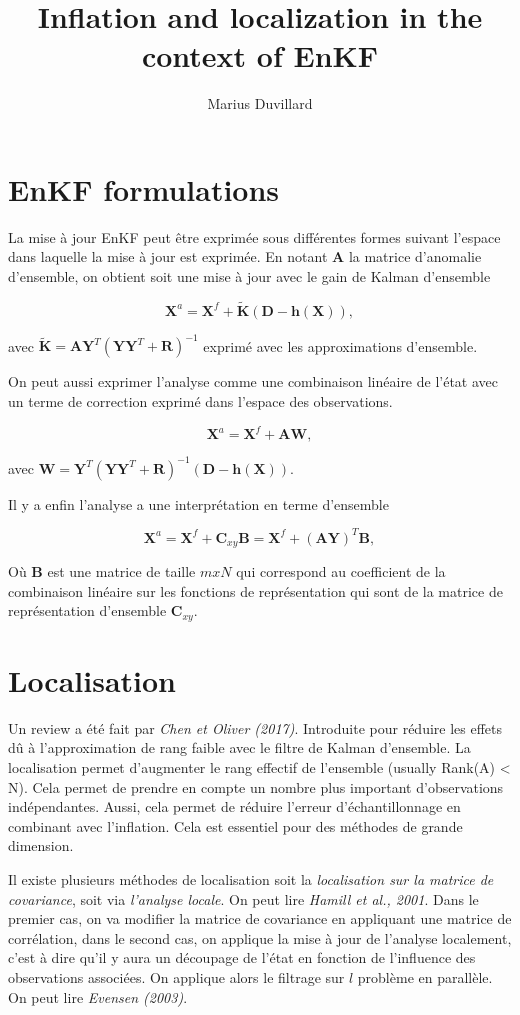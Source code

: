 \documentclass{article}
\title{Inflation and localization in the context of EnKF}
\author{Marius Duvillard}
\newcommand{\bA}{\bm{A}}
\newcommand{\bX}{\bm{X}}
\newcommand{\bK}{\tilde{\bm{K}}}
\newcommand{\bD}{\bm{D}}
\newcommand{\bY}{\bm{Y}}
\newcommand{\bW}{\bm{W}}
\newcommand{\bB}{\bm{B}}
\newcommand{\bR}{\bm{R}}
\newcommand{\bh}{\bm{h}}
\newcommand{\bC}{\bm{C}}
\begin{document}
\maketitle

\section{EnKF formulations}

La mise à jour EnKF peut être exprimée sous différentes formes suivant l'espace dans laquelle la mise à jour est exprimée. En notant $\bA$ la matrice d'anomalie d'ensemble, on obtient soit une mise à jour avec le gain de Kalman d'ensemble

\[
    \bX^a = \bX^f + \bK(\bD - \bh(\bX)),
\]

avec $\bK = \bA\bY^T(\bY \bY^T + \bR)^{-1}$ exprimé avec les approximations d'ensemble.

On peut aussi exprimer l'analyse comme une combinaison linéaire de l'état avec un terme de correction exprimé dans l'espace des observations.

\[
    \bX^a = \bX^f + \bA \bW,
\]

avec $\bW = \bY^T (\bY \bY^T + \bR)^{-1}(\bD - \bh(\bX))$.

Il y a enfin l'analyse a une interprétation en terme d'ensemble

\[
    \bX^a = \bX^f + \bC_{xy} \bB = \bX^f + (\bA \bY)^T \bB,
\]

Où $\bB$ est une matrice de taille $mxN$ qui correspond au coefficient de la combinaison linéaire sur les fonctions de représentation qui sont de la matrice de représentation d'ensemble $\bC_{xy}$.

\section{Localisation}

Un review a été fait par \textit{Chen et Oliver (2017)}.
Introduite pour réduire les effets dû à l'approximation de rang faible avec le filtre de Kalman d'ensemble.
La localisation permet d'augmenter le rang effectif de l'ensemble (usually Rank(A) < N). Cela permet de prendre en compte un nombre plus important d'observations indépendantes. Aussi, cela permet de réduire l'erreur d'échantillonnage en combinant avec l'inflation. Cela est essentiel pour des méthodes de grande dimension.

Il existe plusieurs méthodes de localisation soit la \textit{localisation sur la matrice de covariance}, soit via \textit{l'analyse locale}. On peut lire \textit{Hamill et al., 2001}. Dans le premier cas, on va modifier la matrice de covariance en appliquant une matrice de corrélation, dans le second cas, on applique la mise à jour de l'analyse localement, c'est à dire qu'il y aura un découpage de l'état en fonction de l'influence des observations associées. On applique alors le filtrage sur $l$ problème en parallèle. On peut lire \textit{Evensen (2003)}.
\end{document}
